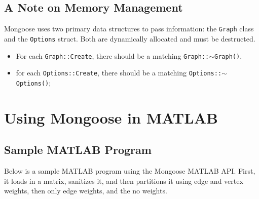 \documentclass[letter]{article}
\begin{document}
\subsection{A Note on Memory Management}

Mongoose uses two primary data structures to pass information: the \texttt{Graph} class and the \texttt{Options} struct. Both are dynamically allocated and must be destructed.

\begin{itemize}
\item For each \texttt{Graph::Create}, there should be a matching \texttt{Graph::$\sim$Graph()}.
\item for each \texttt{Options::Create}, there should be a matching \texttt{Options::$\sim$Options()};
\end{itemize}

\section{Using Mongoose in MATLAB}

\subsection{Sample MATLAB Program}

Below is a sample MATLAB program using the Mongoose MATLAB API. First, it loads in a matrix, sanitizes it, and then partitions it using edge and vertex weights, then only edge weights, and the no weights.
\end{document}
